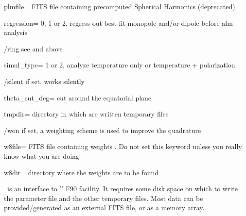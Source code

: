 \begin{keywords}
\begin{kwlist}{}
\item[plmfile=]  FITS file containing precomputed Spherical Harmonics (deprecated) 

\item[regression=]  0, 1 or 2, regress out best fit monopole and/or dipole before
    alm analysis

\item[/ring]  see 
 and 
 above

\item[simul\_type=]  1 or 2, analyze temperature only or temperature + polarization

\item[/silent]     if set, works silently

\item[theta\_cut\_deg=]  cut around the equatorial plane 

\item[tmpdir=]       directory in which are written temporary files 

\item[/won]      if set, a weighting scheme is used to improve the quadrature

\item[w8file=]     FITS file containing weights 
     .
   Do not set this keyword unless you really know what you are doing

\item[w8dir=]      directory where the weights are to be found 

  \end{kwlist}
\end{keywords}  

\begin{codedescription}
{\thedocid\ is an interface to '' F90 facility. It
requires some disk space on which to write the parameter file and the other
temporary files. Most data can be provided/generated as an external FITS
file, or as a memory array.}
\end{codedescription}



